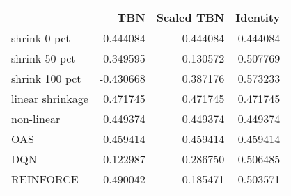 \begin{tabular}{lrrr}
\toprule
{} &       TBN &  Scaled TBN &  Identity \\
\midrule
shrink 0 pct     &  0.444084 &    0.444084 &  0.444084 \\
shrink 50 pct    &  0.349595 &   -0.130572 &  0.507769 \\
shrink 100 pct   & -0.430668 &    0.387176 &  0.573233 \\
linear shrinkage &  0.471745 &    0.471745 &  0.471745 \\
non-linear       &  0.449374 &    0.449374 &  0.449374 \\
OAS              &  0.459414 &    0.459414 &  0.459414 \\
DQN              &  0.122987 &   -0.286750 &  0.506485 \\
REINFORCE        & -0.490042 &    0.185471 &  0.503571 \\
\bottomrule
\end{tabular}
